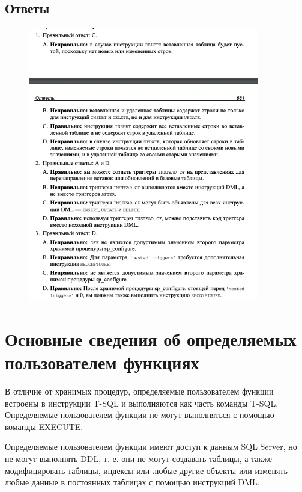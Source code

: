 \subsection*{Ответы}

\begin{figure}[h!]
	\begin{center}
		\includegraphics[width=0.9\textwidth]{img/ans31.png}
	\end{center}
	\captionsetup{justification=centering}
\end{figure}



\section{Основные сведения
об определяемых пользователем функциях}


В отличие от хранимых процедур, определяемые пользователем функции
встроены в инструкции T-SQL и выполняются как часть команды T-SQL. Определяемые пользователем функции не могут выполняться с помощью команды
EXECUTE. 

Определяемые пользователем функции имеют доступ к данным SQL Server, но не
могут выполнять DDL, т. е. они не могут создавать таблицы, а также модифицировать таблицы, индексы или любые другие объекты или изменять любые данные
в постоянных таблицах с помощью инструкций DML. 


